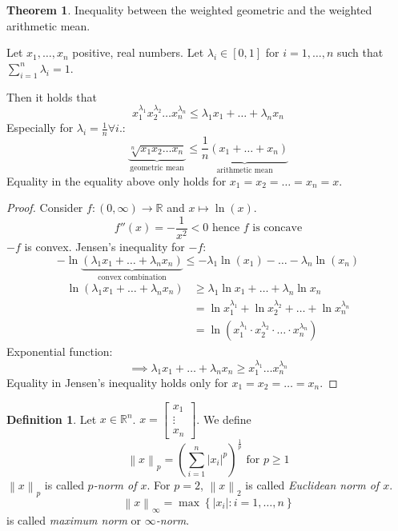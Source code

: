 \documentclass[a4paper,landscape,twocolumn]{article}
\theoremstyle{definition}
\newtheorem{theorem}{Theorem}
\newtheorem{defi}{Definition}
\newcommand\set[1]{\left\{#1\right\}}
\newcommand\abs[1]{\left|#1\right|}
\newcommand\norm[1]{\left\|#1\right\|}
\begin{document}
\begin{theorem}
  Inequality between the weighted geometric and the weighted arithmetic mean.

  Let $x_1, \ldots, x_n$ positive, real numbers.
  Let $\lambda_i \in [0,1]$ for $i = 1, \ldots, n$
  such that $\sum_{i=1}^n \lambda_i = 1$.

  Then it holds that
  \[
    x_1^{\lambda_1} x_2^{\lambda_2} \ldots x_n^{\lambda_n}
    \leq \lambda_1 x_1 + \ldots + \lambda_n x_n
  \]
  Especially for $\lambda_i = \frac1n \forall i$.:
  \[
    \underbrace{\sqrt[n]{x_1 x_2 \ldots x_n}}_{\text{geometric mean}}
    \leq
    \underbrace{\frac1n \left(x_1 + \ldots + x_n\right)}_{\text{arithmetic mean}}
  \]
  Equality in the equality above only holds for
  $x_1 = x_2 = \ldots = x_n = x$.
\end{theorem}
\begin{proof}
  Consider $f: (0,\infty) \to \mathbb R$ and $x \mapsto \ln(x)$.
  \[ f''(x) = -\frac1{x^2} < 0 \text{ hence $f$ is concave} \]
  $-f$ is convex. Jensen's inequality for $-f$:
  \[
    -\ln\underbrace{(\lambda_1 x_1 + \ldots + \lambda_n x_n)}_{\text{convex combination}}
    \leq
    - \lambda_1 \ln(x_1) - \ldots - \lambda_n \ln(x_n)
  \] \begin{align*}
    \ln(\lambda_1 x_1 + \ldots + \lambda_n x_n)
      &\geq \lambda_1 \ln{x_1} + \ldots + \lambda_n \ln{x_n} \\
      &= \ln{x_1^{\lambda_1}} + \ln{x_2^{\lambda_2}} + \ldots + \ln{x_n^{\lambda_n}} \\
      &= \ln(x_1^{\lambda_1} \cdot x_2^{\lambda_2} \cdot \ldots \cdot x_n^{\lambda_n})
  \end{align*}
  Exponential function:
  \[ \implies \lambda_1 x_1 + \ldots + \lambda_n x_n \geq x_1^{\lambda_1} \ldots x_n^{\lambda_n} \]
  Equality in Jensen's inequality holds only for $x_1 = x_2 = \ldots = x_n$.
\end{proof}
\begin{defi}
  Let $x \in \mathbb R^n$. $x = \begin{bmatrix} x_1 \\ \vdots \\ x_n \end{bmatrix}$.
  We define
  \[ \norm{x}_p = \left(\sum_{i=1}^n \abs{x_i}^p\right)^{\frac1p} \text{ for } p \geq 1 \]
  $\norm{x}_p$ is called \emph{$p$-norm of $x$}.
  For $p=2$, $\norm{x}_2$ is called \emph{Euclidean norm of $x$}.
  \[ \norm{x}_\infty = \max\set{\abs{x_i}: i = 1, \ldots, n} \]
  is called \emph{maximum norm} or \emph{$\infty$-norm}.
\end{defi}
\end{document}
